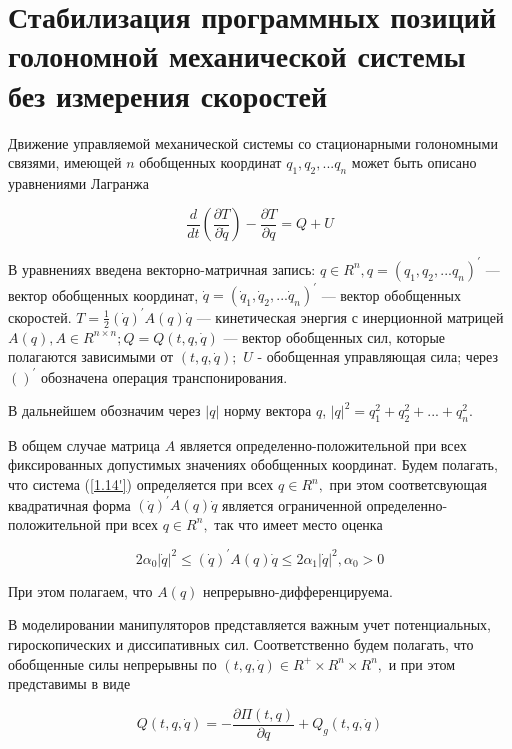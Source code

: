 \section{Стабилизация программных позиций голономной механической системы без измерения скоростей} \label{p12}

Движение управляемой механической системы со стационарными голономными связями, имеющей $n$ обобщенных координат $q_1, q_2, ... q_n$ может быть описано уравнениями Лагранжа 

\begin{equation} \label{1.14'}
\frac{d}{dt} (\frac{\partial T}{\partial \dot q}) - \frac{\partial T}{\partial q} = Q + U
\end{equation}

 В уравнениях введена векторно-матричная запись: $q \in R^n, q = (q_1, q_2, ... q_n)^{'}$ --- вектор обобщенных координат, $\dot q = (\dot q_1, \dot q_2, ... \dot q_n)^{'}$ --- вектор обобщенных скоростей. $T = \frac{1}{2} (\dot q)^{'} A(q) \dot q$ --- кинетическая энергия с инерционной матрицей $A(q), A \in R^{n \times n};  Q = Q(t, q, \dot q)$ --- вектор обобщенных сил, которые полагаются зависимыми от $(t, q, \dot q);$ $U$ - обобщенная управляющая сила; через $( )^{'}$ обозначена операция транспонирования. 

В дальнейшем обозначим через $\left| q \right|$ норму вектора $q$, $\left| q\right|^{2} = q_1^2 + q_2^2 + ... + q_n^2.$

В общем случае матрица $A$ является определенно-положительной при всех фиксированных допустимых значениях обобщенных координат. Будем полагать, что система (\ref{1.14'}) определяется при всех $q \in R^n,$ при этом соответсвующая квадратичная форма $(\dot q)^{'} A(q) \dot q$ является ограниченной определенно-положительной при всех $q \in R^n,$ так что имеет место оценка 

\begin{equation} \label{1.15'}
2 \alpha_0 \left| \dot q \right|^2 \le (\dot q)^{'} A(q) \dot q \le 2 \alpha_1 \left| \dot q \right|^2, \alpha_0 > 0
\end{equation}

При этом полагаем, что $A(q)$ непрерывно-дифференцируема.

В моделировании манипуляторов представляется важным учет потенциальных, гироскопических и диссипативных сил. Соответственно будем полагать, что обобщенные силы непрерывны по $(t, q, \dot q) \in R^{+} \times R^{n} \times R^{n},$ и при этом представимы в виде

\begin{equation} \label{1.16'}
Q(t, q, \dot q) = -\frac{\partial \Pi (t, q)}{\partial q} + Q_g (t, q, \dot q)
\end{equation}

